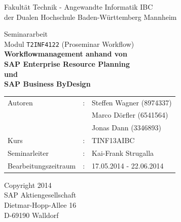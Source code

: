 \begin{center}

\vspace{0.5cm}
{\large Fakultät Technik - Angewandte Informatik IBC}\\
{\large der Dualen Hochschule Baden-Württemberg Mannheim}\\

\vspace{1.5cm}

{\Large Seminararbeit \\
				Modul \verb|T2INF4122| (Proseminar Workflow) 
}\\

\vspace{1.5cm}
{ \Large \textbf{
        Workflowmanagement anhand von \\ SAP Enterprise Resource Planning \\ und \\ SAP Business ByDesign\\
				}
}

\vspace{1.5cm}

\begin{tabular}{lll}
Autoren	&:& Steffen Wagner (8974337) \\
&& Marco Dörfler (6541564) \\
&& Jonas Dann (3346893) \\
Kurs   &:& TINF13AIBC \\
Seminarleiter   &:& Kai-Frank Strugalla \\
Bearbeitungszeitraum   &:& 17.05.2014 - 22.06.2014 \\
\end{tabular}


\vspace{1.5cm}
Copyright 2014 \\
SAP Aktiengesellschaft \\
Dietmar-Hopp-Allee 16 \\
D-69190 Walldorf \\
\vspace{0.5cm}

\end{center}
\newpage
\thispagestyle{empty}
\mbox{}